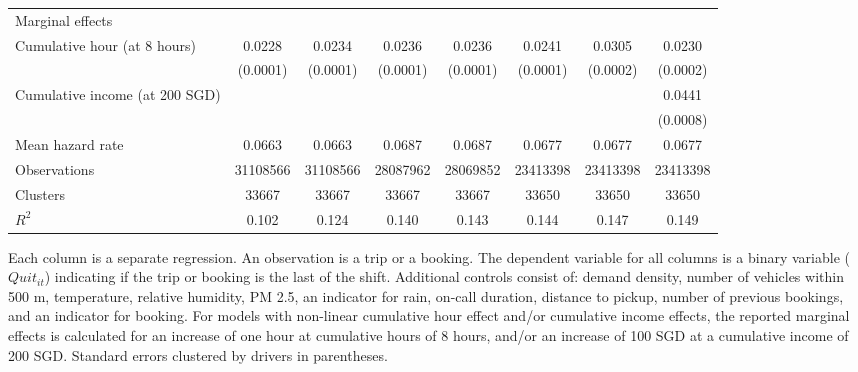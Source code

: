 \documentclass[reviewmode,AEJ]{AEA}
\begin{document}
\begin{table}
\begin{tabularx}{\textwidth}{l@{\extracolsep{\fill}}*{7}{S}}
        \midrule
        Marginal effects & & & & & &\\
        \quad Cumulative hour (at 8 hours)&      0.0228&      0.0234&      0.0236&      0.0236&      0.0241&      0.0305&      0.0230\\
                    &    (0.0001)&    (0.0001)&    (0.0001)&    (0.0001)&    (0.0001)&    (0.0002)&    (0.0002)\\
        \addlinespace
        \quad Cumulative income (at 200 SGD)&            &            &            &            &            &            &      0.0441\\
                    &         &         &         &         &         &         &    (0.0008)\\
        \midrule
        Mean hazard rate&      0.0663&      0.0663&      0.0687&      0.0687&      0.0677&      0.0677&      0.0677\\
        Observations&\num{31108566}&\num{31108566}&\num{28087962}&\num{28069852}&\num{23413398}&\num{23413398}&\num{23413398}\\
        Clusters    & \num{33667}& \num{33667}& \num{33667}& \num{33667}& \num{33650}& \num{33650}& \num{33650}\\
        \(R^2\)     &       0.102&       0.124&       0.140&       0.143&       0.144&       0.147&       0.149\\
        \bottomrule
    \end{tabularx}

	\begin{tablenotes}
        Each column is a separate regression. An observation is a trip or a booking. The dependent variable for all columns is a binary variable ($Quit_{it}$) indicating if the trip or booking is the last of the shift. Additional controls consist of: demand density, number of vehicles within 500 m, temperature, relative humidity, PM 2.5, an indicator for rain, on-call duration, distance to pickup, number of previous bookings, and an indicator for booking. For models with non-linear cumulative hour effect and/or cumulative income effects, the reported marginal effects is calculated for an increase of one hour at cumulative hours of 8 hours, and/or an increase of 100 SGD at a cumulative income of 200 SGD.  Standard errors clustered by drivers in parentheses. 
	\end{tablenotes}
\end{table}
\end{document}

